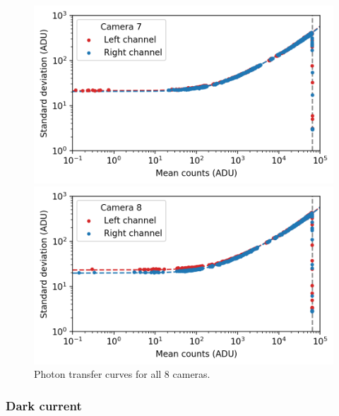 \begin{colsection}
\begin{colsection}
\begin{figure}[p]
\begin{center}
        \begin{minipage}[t]{0.49\textwidth}\vspace{10pt}
            \includegraphics[width=\linewidth]{images/detectors/ptc_7.png}
        \end{minipage}
        \begin{minipage}[t]{0.49\textwidth}\vspace{10pt}
            \includegraphics[width=\linewidth]{images/detectors/ptc_8.png}
        \end{minipage}
    \end{center}
    \caption[Photon transfer curves for all 8 cameras]{
        Photon transfer curves for all 8 cameras.
        }\label{fig:ptcs}
\end{figure}

\clearpage

\newpage
\subsubsection{Dark current}


\end{colsection}
\end{colsection}
